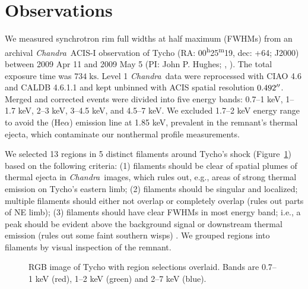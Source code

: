 \documentclass[iop, apj, numberedappendix, twocolappendix]{emulateapj}
\newcommand*{\mt}{\mathrm}
\newcommand*{\unit}[1]{\;\mt{#1}}  %
\newcommand*{\tsup}{\textsuperscript}
\newcommand*{\Chandra}{\textit{Chandra}\ }
\begin{document}
\section{Observations}
\label{sec:observations}

We measured synchrotron rim full widths at half maximum (FWHMs) from an
archival \Chandra ACIS-I observation of Tycho
(RA: 00\tsup{h}25\tsup{m}19, dec: +64; J2000)
between 2009 Apr 11 and 2009 May 5 (PI: John P. Hughes;
,
).
The total exposure time was $734 \unit{ks}$.
Level 1 \Chandra data were reprocessed with CIAO 4.6 and CALDB 4.6.1.1 and kept
unbinned with ACIS spatial resolution $0.492\mbox{$^{\prime\prime}$}$.
Merged and corrected events were divided into five energy bands:
0.7--1 keV, 1--1.7 keV, 2--3 keV, 3--4.5 keV, and 4.5--7 keV.
We excluded 1.7--2 keV energy range to avoid the  (He$\alpha$)
emission line at 1.85 keV, prevalent in the remnant's thermal ejecta, which
  
contaminate our nonthermal profile measurements.

We selected 13 regions in 5 distinct filaments around Tycho's shock
(Figure~\ref{fig:snr}) based on the following criteria: (1) filaments should be
clear of spatial plumes of thermal ejecta in \Chandra images, which rules out,
e.g., areas of strong thermal emission on Tycho's eastern limb; (2) filaments
should be singular and localized; multiple filaments should either not
overlap or completely overlap (rules out parts of NE limb); (3) filaments
should have clear FWHMs in most energy band; i.e., a peak should be evident
above the background signal or downstream thermal emission (rules out some
faint southern wisps) .  We grouped
regions into filaments by visual inspection of the remnant.

\begin{figure}
    \centering
    \caption{RGB image of Tycho with region selections overlaid.  Bands are
    0.7--1 keV (red), 1--2 keV (green) and 2--7 keV (blue).
    }
    \label{fig:snr}
\end{figure}
\end{document}
